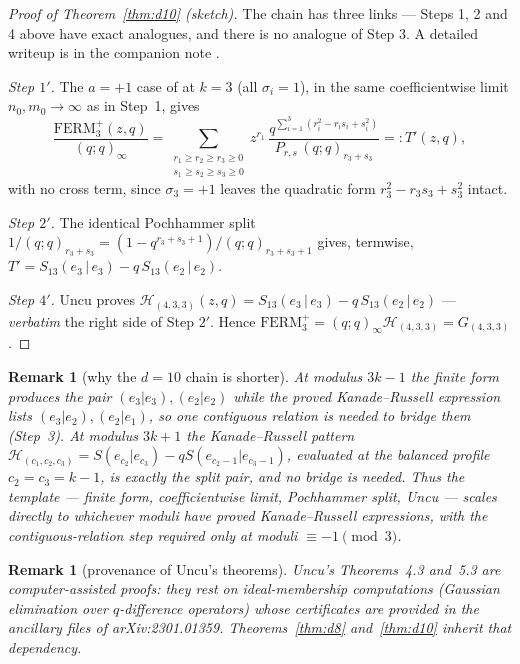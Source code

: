 \documentclass[11pt]{article}
\newtheorem{remark}[theorem]{Remark}
\newcommand{\poch}[1]{(q;q)_{#1}}
\newcommand{\FERM}{\mathrm{FERM}}
\begin{document}
\begin{proof}[Proof of Theorem~\ref{thm:d10} (sketch)]
The chain has three links --- Steps 1, 2 and 4 above have exact
analogues, and there is no analogue of Step 3. A detailed writeup is in
the companion note \cite{Comp26}.

\emph{Step $1'$.} The $a=+1$ case of \cite[Proposition~7.1]{W23} at
$k=3$ (all $\sigma_i=1$), in the same coefficientwise limit
$n_0,m_0\to\infty$ as in Step~1, gives
\[
\frac{\FERM^{+}_3(z,q)}{\poch{\infty}}
=\sum_{\substack{r_1\ge r_2\ge r_3\ge 0\\ s_1\ge s_2\ge s_3\ge 0}}
z^{r_1}\,
\frac{q^{\sum_{i=1}^{3}(r_i^2-r_is_i+s_i^2)}}{P_{r,s}\,\poch{r_3+s_3}}
=:T'(z,q),
\]
with no cross term, since $\sigma_3=+1$ leaves the quadratic form
$r_3^2-r_3s_3+s_3^2$ intact.

\emph{Step $2'$.} The identical Pochhammer split
$1/\poch{r_3+s_3}=(1-q^{r_3+s_3+1})/\poch{r_3+s_3+1}$ gives, termwise,
$T'=S_{13}(e_3\,|\,e_3)-q\,S_{13}(e_2\,|\,e_2)$.

\emph{Step $4'$.} Uncu \cite[Eq.~(5.1), last entry, and
Theorem~5.3]{Uncu23} proves
$\mathcal{H}_{(4,3,3)}(z,q)=S_{13}(e_3\,|\,e_3)-q\,S_{13}(e_2\,|\,e_2)$
--- \emph{verbatim} the right side of Step $2'$. Hence
$\FERM^{+}_3=\poch{\infty}\mathcal{H}_{(4,3,3)}=G_{(4,3,3)}$.
\end{proof}

\begin{remark}[why the $d=10$ chain is shorter]\label{rem:scale}
At modulus $3k-1$ the finite form produces the pair
$(e_3|e_3),(e_2|e_2)$ while the proved Kanade--Russell expression lists
$(e_3|e_2),(e_2|e_1)$, so one contiguous relation is needed to bridge
them (Step~3). At modulus $3k+1$ the Kanade--Russell pattern
$\mathcal{H}_{(c_1,c_2,c_3)}=S(e_{c_2}|e_{c_3})-qS(e_{c_2-1}|e_{c_3-1})$,
evaluated at the balanced profile $c_2=c_3=k-1$, is exactly the split
pair, and no bridge is needed. Thus the template --- finite form,
coefficientwise limit, Pochhammer split, Uncu --- scales directly to
whichever moduli have proved Kanade--Russell expressions, with the
contiguous-relation step required only at moduli $\equiv-1\pmod 3$.
\end{remark}

\begin{remark}[provenance of Uncu's theorems]\label{rem:prov}
Uncu's Theorems~4.3 and~5.3 \cite{Uncu23} are computer-assisted proofs:
they rest on ideal-membership computations (Gaussian elimination over
$q$-difference operators) whose certificates are provided in the
ancillary files of arXiv:2301.01359. Theorems~\ref{thm:d8}
and~\ref{thm:d10} inherit that dependency.
\end{remark}
\end{document}
